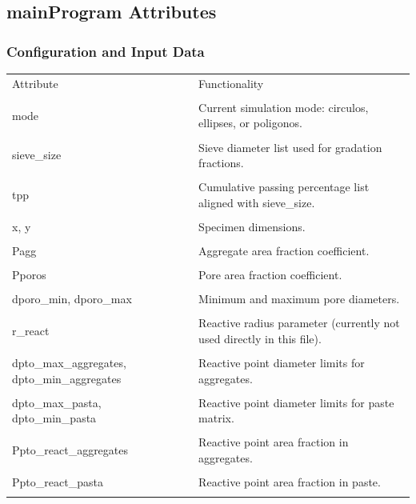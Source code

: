 ﻿\documentclass[11pt,a4paper]{article}
\begin{document}
\subsection*{mainProgram Attributes}

\subsubsection*{Configuration and Input Data}

\begin{longtable}{|p{}|p{}|}
\hline
Attribute & Functionality \\\\
\hline
mode & Current simulation mode: circulos, ellipses, or poligonos. \\\\
\hline
sieve\_size & Sieve diameter list used for gradation fractions. \\\\
\hline
tpp & Cumulative passing percentage list aligned with sieve\_size. \\\\
\hline
x, y & Specimen dimensions. \\\\
\hline
Pagg & Aggregate area fraction coefficient. \\\\
\hline
Pporos & Pore area fraction coefficient. \\\\
\hline
dporo\_min, dporo\_max & Minimum and maximum pore diameters. \\\\
\hline
r\_react & Reactive radius parameter (currently not used directly in this file). \\\\
\hline
dpto\_max\_aggregates, dpto\_min\_aggregates & Reactive point diameter limits for aggregates. \\\\
\hline
dpto\_max\_pasta, dpto\_min\_pasta & Reactive point diameter limits for paste matrix. \\\\
\hline
Ppto\_react\_aggregates & Reactive point area fraction in aggregates. \\\\
\hline
Ppto\_react\_pasta & Reactive point area fraction in paste. \\\\

\end{longtable}
\end{document}
